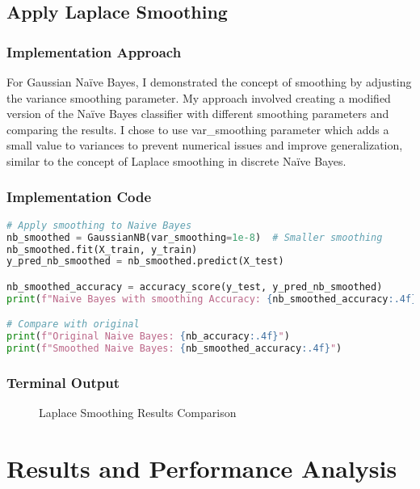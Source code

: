 \documentclass[12pt,a4paper]{article}
\begin{document}
\subsection{Apply Laplace Smoothing}

\subsubsection{Implementation Approach}
For Gaussian Na\"{i}ve Bayes, I demonstrated the concept of smoothing by adjusting the variance smoothing parameter. My approach involved creating a modified version of the Na\"{i}ve Bayes classifier with different smoothing parameters and comparing the results. I chose to use var\_smoothing parameter which adds a small value to variances to prevent numerical issues and improve generalization, similar to the concept of Laplace smoothing in discrete Na\"{i}ve Bayes.

\subsubsection{Implementation Code}
\begin{lstlisting}[language=Python, caption=Apply Laplace Smoothing]
# Apply smoothing to Naive Bayes
nb_smoothed = GaussianNB(var_smoothing=1e-8)  # Smaller smoothing
nb_smoothed.fit(X_train, y_train)
y_pred_nb_smoothed = nb_smoothed.predict(X_test)

nb_smoothed_accuracy = accuracy_score(y_test, y_pred_nb_smoothed)
print(f"Naive Bayes with smoothing Accuracy: {nb_smoothed_accuracy:.4f}")

# Compare with original
print(f"Original Naive Bayes: {nb_accuracy:.4f}")
print(f"Smoothed Naive Bayes: {nb_smoothed_accuracy:.4f}")
\end{lstlisting}

\subsubsection{Terminal Output}

\begin{figure}[h!]
    \centering
    \caption{Laplace Smoothing Results Comparison}
\end{figure}

\section{Results and Performance Analysis}
\end{document}
